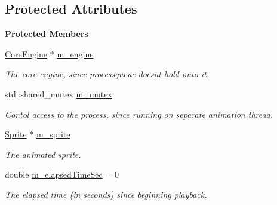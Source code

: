 \subsection*{Protected Attributes}
\begin{Indent}\textbf{ Protected Members}\par
\begin{DoxyCompactItemize}
\item 
\mbox{\label{classrev_1_1_sprite_animation_process_a50cd7d3a4b14b608e8a3e0fefd5f3dbe}} 
\mbox{\hyperlink{classrev_1_1_core_engine}{Core\+Engine}} $\ast$ \mbox{\hyperlink{classrev_1_1_sprite_animation_process_a50cd7d3a4b14b608e8a3e0fefd5f3dbe}{m\+\_\+engine}}
\begin{DoxyCompactList}\small\item\em The core engine, since processqueue doesn\textquotesingle{}t hold onto it. \end{DoxyCompactList}\item 
\mbox{\label{classrev_1_1_sprite_animation_process_a64bde39904b37d7f90c37da95d3a6498}} 
std\+::shared\+\_\+mutex \mbox{\hyperlink{classrev_1_1_sprite_animation_process_a64bde39904b37d7f90c37da95d3a6498}{m\+\_\+mutex}}
\begin{DoxyCompactList}\small\item\em Contol access to the process, since running on separate animation thread. \end{DoxyCompactList}\item 
\mbox{\label{classrev_1_1_sprite_animation_process_a5f5168840472809e1f14083c0ccd7b9a}} 
\mbox{\hyperlink{classrev_1_1_sprite}{Sprite}} $\ast$ \mbox{\hyperlink{classrev_1_1_sprite_animation_process_a5f5168840472809e1f14083c0ccd7b9a}{m\+\_\+sprite}}
\begin{DoxyCompactList}\small\item\em The animated sprite. \end{DoxyCompactList}\item 
\mbox{\label{classrev_1_1_sprite_animation_process_ae0c4bc5ba7ba8e56d17dd076773e953d}} 
double \mbox{\hyperlink{classrev_1_1_sprite_animation_process_ae0c4bc5ba7ba8e56d17dd076773e953d}{m\+\_\+elapsed\+Time\+Sec}} = 0
\begin{DoxyCompactList}\small\item\em The elapsed time (in seconds) since beginning playback. \end{DoxyCompactList}\end{DoxyCompactItemize}
\end{Indent}
